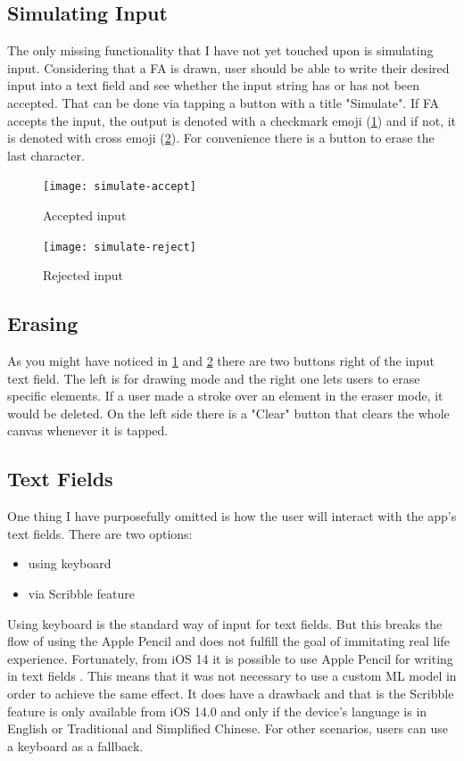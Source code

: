 \subsection{Simulating Input}

The only missing functionality that I have not yet touched upon is simulating input. Considering that a FA is drawn, user should be able to write their desired input into a text field and see whether the input string has or has not been accepted. That can be done via tapping a button with a title "Simulate". If FA accepts the input, the output is denoted with a checkmark emoji (\ref{simulate-accept}) and if not, it is denoted with cross emoji (\ref{simulate-reject}). For convenience there is a button to erase the last character.

\begin{figure}
    \texttt{[image: simulate-accept]}
    \caption{Accepted input}\label{simulate-accept}
\end{figure}

\begin{figure}
    \texttt{[image: simulate-reject]}
    \caption{Rejected input}\label{simulate-reject}
\end{figure}

\subsection{Erasing}

As you might have noticed in \ref{simulate-accept} and \ref{simulate-reject} there are two buttons right of the input text field. The left is for drawing mode and the right one lets users to erase specific elements. If a user made a stroke over an element in the eraser mode, it would be deleted. On the left side there is a "Clear" button that clears the whole canvas whenever it is tapped.

\subsection{Text Fields}

One thing I have purposefully omitted is how the user will interact with the app's text fields. There are two options:
\begin{itemize}
    \item using keyboard
    \item via Scribble feature
\end{itemize}

Using keyboard is the standard way of input for text fields. But this breaks the flow of using the Apple Pencil and does not fulfill the goal of immitating real life experience. Fortunately, from iOS 14 it is possible to use Apple Pencil for writing in text fields \cite{scribble}. This means that it was not necessary to use a custom ML model in order to achieve the same effect. It does have a drawback and that is the Scribble feature is only available from iOS 14.0 and only if the device's language is in English or Traditional and Simplified Chinese. For other scenarios, users can use a keyboard as a fallback.

